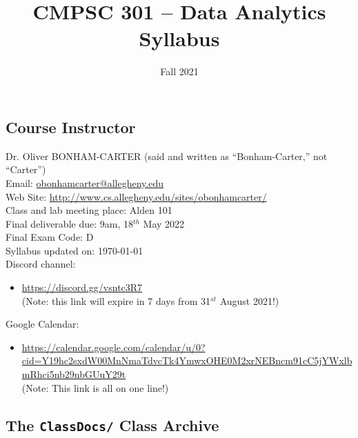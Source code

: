 \documentclass[11pt]{article} %
\title{\textbf{CMPSC 301 -- Data Analytics\\Syllabus}}
\author{Fall 2021}
\date{}
\begin{document}
\maketitle

\subsection*{\textbf{Course Instructor}}
Dr. Oliver BONHAM-CARTER (said and written as ``Bonham-Carter,'' not “Carter'')\\
\noindent Email: \url{obonhamcarter@allegheny.edu} \\
\noindent Web Site: \url{http://www.cs.allegheny.edu/sites/obonhamcarter/} \\
\noindent Class and lab meeting place: Alden 101\\
\noindent Final deliverable due: 9am, 18$^{th}$ May 2022\\ %
\noindent Final Exam Code: D\\  
\noindent Syllabus updated on: \today\\

\noindent Discord channel: 
\begin{itemize} 
	\item \url{https://discord.gg/vsntc3R7}\\ \color{red}(Note: this link will expire in 7 days from 31$^{st}$ August 2021!)\color{black}\\
\end{itemize}

\noindent Google Calendar:
\begin{itemize}
\item {\footnotesize \url{https://calendar.google.com/calendar/u/0?cid=Y19hc2sxdW00MnNmaTdvcTk4YmwxOHE0M2xrNEBncm91cC5jYWxlbmRhci5nb29nbGUuY29t}}\\\color{red}(Note: This link is all on one line!)\color{black}\\
\end{itemize}


\subsection*{The {\tt ClassDocs/} Class Archive}
\end{document}

